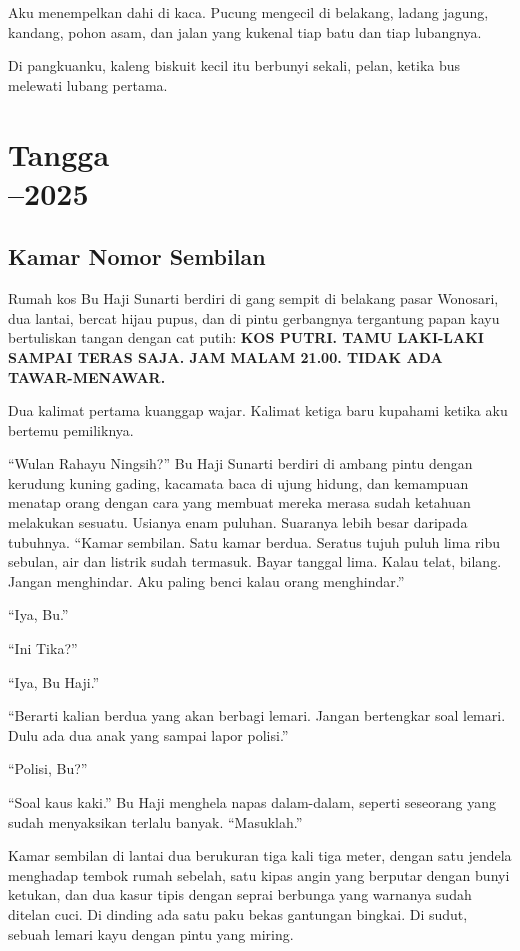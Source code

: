 \documentclass[11pt,twoside,openany]{book}
\begin{document}
Aku menempelkan dahi di kaca. Pucung mengecil di belakang, ladang jagung, kandang, pohon asam, dan jalan yang kukenal tiap batu dan tiap lubangnya.

Di pangkuanku, kaleng biskuit kecil itu berbunyi sekali, pelan, ketika bus melewati lubang pertama.

\part[Tangga]{Tangga\\[0.7em]\normalsize{}--2025}
\chapter{Kamar Nomor Sembilan}
Rumah kos Bu Haji Sunarti berdiri di gang sempit di belakang pasar Wonosari, dua lantai, bercat hijau pupus, dan di pintu gerbangnya tergantung papan kayu bertuliskan tangan dengan cat putih: \textbf{KOS PUTRI. TAMU LAKI-LAKI SAMPAI TERAS SAJA. JAM MALAM 21.00. TIDAK ADA TAWAR-MENAWAR.}

Dua kalimat pertama kuanggap wajar. Kalimat ketiga baru kupahami ketika aku bertemu pemiliknya.

``Wulan Rahayu Ningsih?'' Bu Haji Sunarti berdiri di ambang pintu dengan kerudung kuning gading, kacamata baca di ujung hidung, dan kemampuan menatap orang dengan cara yang membuat mereka merasa sudah ketahuan melakukan sesuatu. Usianya enam puluhan. Suaranya lebih besar daripada tubuhnya. ``Kamar sembilan. Satu kamar berdua. Seratus tujuh puluh lima ribu sebulan, air dan listrik sudah termasuk. Bayar tanggal lima. Kalau telat, bilang. Jangan menghindar. Aku paling benci kalau orang menghindar.''

``Iya, Bu.''

``Ini Tika?''

``Iya, Bu Haji.''

``Berarti kalian berdua yang akan berbagi lemari. Jangan bertengkar soal lemari. Dulu ada dua anak yang sampai lapor polisi.''

``Polisi, Bu?''

``Soal kaus kaki.'' Bu Haji menghela napas dalam-dalam, seperti seseorang yang sudah menyaksikan terlalu banyak. ``Masuklah.''

Kamar sembilan di lantai dua berukuran tiga kali tiga meter, dengan satu jendela menghadap tembok rumah sebelah, satu kipas angin yang berputar dengan bunyi ketukan, dan dua kasur tipis dengan seprai berbunga yang warnanya sudah ditelan cuci. Di dinding ada satu paku bekas gantungan bingkai. Di sudut, sebuah lemari kayu dengan pintu yang miring.
\end{document}
